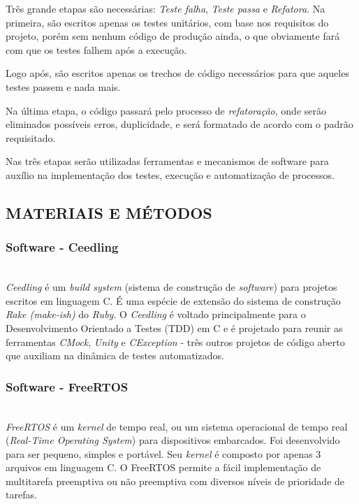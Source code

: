 \documentclass[times, twoside, watermark]{artigo}
\begin{document}
Três grande etapas são necessárias: \textit{Teste falha}, \textit{Teste passa}
e \textit{Refatora}. Na primeira, são escritos apenas os testes unitários, com base 
nos requisitos do projeto, porém sem nenhum código de produção ainda, o que 
obviamente fará com que os testes falhem após a execução.

Logo após, são escritos apenas os trechos de código necessários para que aqueles 
testes passem e nada mais.

Na última etapa, o código passará pelo processo de \textit{refatoração}, onde serão 
eliminados possíveis erros, duplicidade, e será formatado de acordo com o padrão 
requisitado.

Nas três etapas serão utilizadas ferramentas e mecanismos de software para auxílio
na implementação dos testes, execução e automatização de processos.

\subsection{MATERIAIS E MÉTODOS}

\subsubsection{Software - Ceedling}\hfill\\

\textit{Ceedling} é um \textit{build system} (sistema de construção de 
\textit{software}) para projetos escritos em linguagem C.
É uma espécie de extensão do sistema de construção \textit{Rake (make-ish)} do \textit{Ruby}.
O \textit{Ceedling} é voltado principalmente para o 
Desenvolvimento Orientado a Testes (TDD) em C e é projetado para reunir as ferramentas \textit{CMock},
\textit{Unity} e \textit{CException} - três outros projetos de código aberto 
que auxiliam na dinâmica de testes automatizados\cite{gomes2016uttos}.


\subsubsection{Software - FreeRTOS}\hfill\\

\textit{FreeRTOS} é um \textit{kernel} de tempo real, 
ou um sistema operacional de tempo real (\textit{Real-Time Operating System}) 
para dispositivos embarcados. Foi desenvolvido para ser pequeno, simples e portável. 
Seu \textit{kernel} é composto por apenas 3 arquivos em linguagem C. 
O FreeRTOS permite a fácil implementação de multitarefa preemptiva 
ou não preemptiva com diversos níveis de prioridade de tarefas\cite{zhu2016understanding}.
\end{document}
